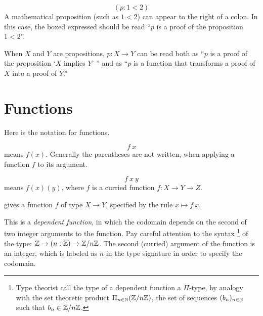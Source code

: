\documentclass[12pt]{article}
\numberwithin{definition}{section}
\begin{document}
\[
\boxed{(p : 1 < 2)}
\]
A mathematical proposition (such as $1<2$) can appear to the right
of a colon.  In this case, the boxed expressed should be read
``$p$ is a proof of the proposition $1<2$''.  

When $X$ and $Y$ are
propositions, $p: X\to Y$ can be read both as ``$p$ is a proof
of the proposition `$X$ implies $Y$' ''  and as ``$p$ is a function
that transforms a proof of $X$ into a proof of $Y$.''

\section{Functions}

Here is the notation for functions.


\[
\boxed{f\ x}
\]
means $f(x)$.  Generally the parentheses are not written, when
applying a function $f$ to its argument.

\[
\boxed{f\ x\ y}
\]
means $f(x)(y)$, where $f$ is a curried function $f:X\to Y\to Z$.


\begin{center}
\end{center}
gives a function $f$ of type $X\to Y$, specified by the rule $x\mapsto f\ x$.

\begin{center}
\end{center}
This is a \emph{dependent function}, in which the codomain depends on
the second of two integer arguments to the function.  Pay careful
attention to the syntax%
\footnote{Type theorist call the type of a dependent function a
  $\Pi$-type, by analogy with the set theoretic product $\Pi_{n\in{\mathbb N}}
  ({\mathbb Z}/n{\mathbb Z})$, the set of sequences $(b_n)_{n\in{\mathbb N}}$ such that
  $b_n\in {\mathbb Z}/n{\mathbb Z}$.}
%
of the type: ${\mathbb Z}\to (n:{\mathbb Z}) \to
{\mathbb Z}/n{\mathbb Z}$. The second (curried) argument of the function is an
integer, which is labeled as $n$ in the type signature in order to
specify the codomain.
\end{document}
